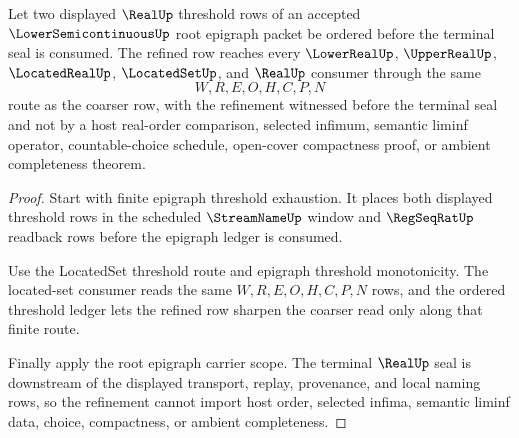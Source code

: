 \begin{theorem}
\label{thm:lowersemicontinuous-epigraph-threshold-refinement}
Let two displayed $\RealUp$ threshold rows of an accepted $\LowerSemicontinuousUp$ root epigraph packet be ordered before the terminal seal is consumed. The refined row reaches every $\LowerRealUp$, $\UpperRealUp$, $\LocatedRealUp$, $\LocatedSetUp$, and $\RealUp$ consumer through the same
$$
W,R,E,O,H,C,P,N
$$
route as the coarser row, with the refinement witnessed before the terminal seal and not by a host real-order comparison, selected infimum, semantic liminf operator, countable-choice schedule, open-cover compactness proof, or ambient completeness theorem.
\end{theorem}
\begin{proof}
Start with finite epigraph threshold exhaustion. It places both displayed threshold rows in the scheduled $\StreamNameUp$ window and $\RegSeqRatUp$ readback rows before the epigraph ledger is consumed.

Use the LocatedSet threshold route and epigraph threshold monotonicity. The located-set consumer reads the same $W,R,E,O,H,C,P,N$ rows, and the ordered threshold ledger lets the refined row sharpen the coarser read only along that finite route.

Finally apply the root epigraph carrier scope. The terminal $\RealUp$ seal is downstream of the displayed transport, replay, provenance, and local naming rows, so the refinement cannot import host order, selected infima, semantic liminf data, choice, compactness, or ambient completeness.
\end{proof}

